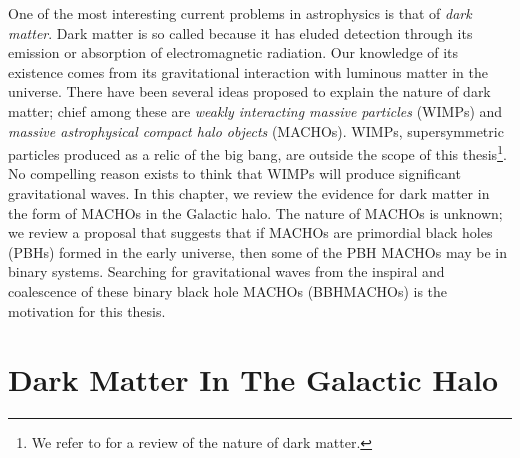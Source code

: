
One of the most interesting current problems in astrophysics is that of
\emph{dark matter}. Dark matter is so called because it has eluded detection
through its emission or absorption of electromagnetic radiation. Our knowledge
of its existence comes from its gravitational interaction with luminous matter
in the universe. There have been several ideas proposed to explain the nature
of dark matter; chief among these are \emph{weakly interacting massive
particles} (WIMPs) and \emph{massive astrophysical compact halo objects}
(MACHOs)\cite{Griest:1990vu}.  WIMPs, supersymmetric particles produced as a
relic of the big bang, are outside the scope of this thesis\footnote{We refer
to \cite{Griest:1995gs} for a review of the nature of dark matter.}. No
compelling reason exists to think that WIMPs will produce significant
gravitational waves. In this chapter, we review the evidence for dark matter
in the form of MACHOs in the Galactic halo. The nature of MACHOs is unknown;
we review a proposal that suggests that if MACHOs are primordial black holes
(PBHs) formed in the early universe, then some of the PBH MACHOs may be in
binary systems\cite{Nakamura:1997sm}. Searching for gravitational waves from
the inspiral and coalescence of these binary black hole MACHOs (BBHMACHOs) is
the motivation for this thesis.

\section{Dark Matter In The Galactic Halo}
\label{s:darkmatter}


